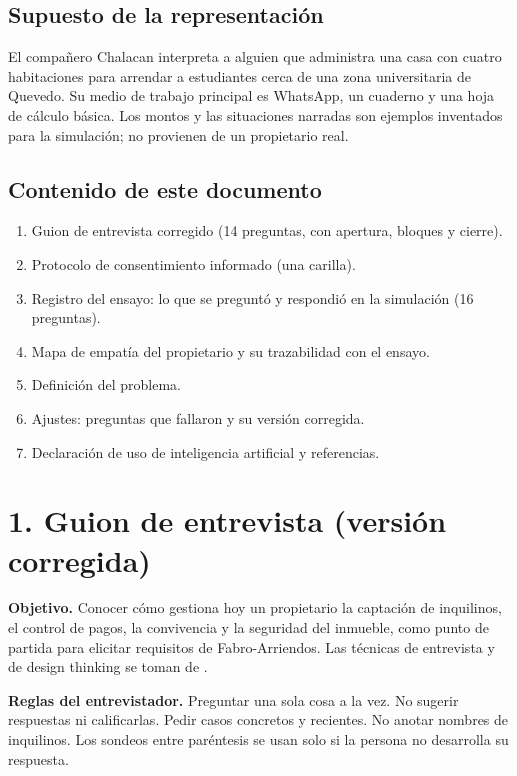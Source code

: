 \documentclass[11pt,a4paper]{article}
\begin{document}
\subsection*{Supuesto de la representación}

El compañero Chalacan interpreta a alguien que administra una casa con cuatro habitaciones para arrendar a estudiantes cerca de una zona universitaria de Quevedo. Su medio de trabajo principal es WhatsApp, un cuaderno y una hoja de cálculo básica. Los montos y las situaciones narradas son ejemplos inventados para la simulación; no provienen de un propietario real.

\subsection*{Contenido de este documento}

\begin{enumerate}
\item Guion de entrevista corregido (14 preguntas, con apertura, bloques y cierre).
\item Protocolo de consentimiento informado (una carilla).
\item Registro del ensayo: lo que se preguntó y respondió en la simulación (16 preguntas).
\item Mapa de empatía del propietario y su trazabilidad con el ensayo.
\item Definición del problema.
\item Ajustes: preguntas que fallaron y su versión corregida.
\item Declaración de uso de inteligencia artificial y referencias.
\end{enumerate}


\clearpage

\section*{1. Guion de entrevista (versión corregida)}

\textbf{Objetivo.} Conocer cómo gestiona hoy un propietario la captación de inquilinos, el control de pagos, la convivencia y la seguridad del inmueble, como punto de partida para elicitar requisitos de Fabro-Arriendos. Las técnicas de entrevista y de design thinking se toman de \cite{pohl2025,buhne2026}.

\textbf{Reglas del entrevistador.} Preguntar una sola cosa a la vez. No sugerir respuestas ni calificarlas. Pedir casos concretos y recientes. No anotar nombres de inquilinos. Los sondeos entre paréntesis se usan solo si la persona no desarrolla su respuesta.
\end{document}
